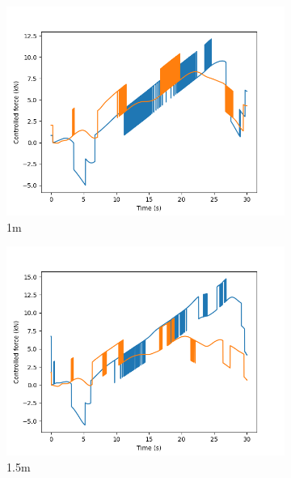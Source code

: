 \documentclass[class=article, crop=false]{standalone}
\begin{document}
\begin{figure}
\begin{subfigure}[b]{0.48\textwidth}
        \includegraphics{scenario1/rov-100m/1.0m/usv_forces}
        \caption{1m}
        \label{}
    \end{subfigure}
    \hfill
    \begin{subfigure}[b]{0.48\textwidth}
        \centering
        \includegraphics{scenario1/rov-100m/1.5m/usv_forces}
        \caption{1.5m}
        \label{}
    \end{subfigure}
    \vfill
    \begin{subfigure}[b]{0.48\textwidth}
        \centering

\end{subfigure}
\end{figure}
\end{document}
